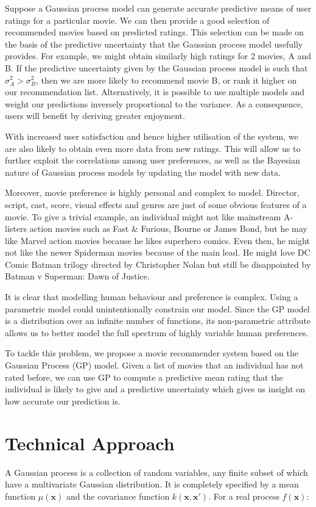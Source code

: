 \documentclass[letterpaper]{article}
\begin{document}
Suppose a Gaussian process model can generate accurate predictive means of user ratings for a particular movie. We can then provide a good selection of recommended movies based on predicted ratings. This selection can be made on the basis of the predictive uncertainty that the Gaussian process model usefully provides. For example, we might obtain similarly high ratings for 2 movies, A and B. If the predictive uncertainty given by the Gaussian process model is such that $\sigma_A^2 > \sigma_B^2$, then we are more likely to recommend movie B, or rank it higher on our recommendation list. Alternatively, it is possible to use multiple models and weight our predictions inversely proportional to the variance. As a consequence, users will benefit by deriving greater enjoyment.

With increased user satisfaction and hence higher utilisation of the system, we are also likely to obtain even more data from new ratings. This will allow us to further exploit the correlations among user preferences, as well as the Bayesian nature of Gaussian process models by updating the model with new data.

Moreover, movie preference is highly personal and complex to model. Director, script, cast, score, visual effects and genres are just of some obvious features of a movie. To give a trivial example, an individual might not like mainstream A-listers action movies such as Fast \& Furious, Bourne or James Bond, but he may like Marvel action movies because he likes superhero comics. Even then, he might not like the newer Spiderman movies because of the main lead. He might love DC Comic Batman trilogy directed by Christopher Nolan but still be disappointed by Batman v Superman: Dawn of Justice.

It is clear that modelling human behaviour and preference is complex. Using a parametric model could unintentionally constrain our model. Since the GP model is a distribution over an infinite number of functions, its non-parametric attribute allows us to better model the full spectrum of highly variable human preferences.

To tackle this problem, we propose a movie recommender system based on the Gaussian Process (GP) model. Given a list of movies that an individual has not rated before, we can use GP to compute a predictive mean rating that the individual is likely to give and a predictive uncertainty which gives us insight on how accurate our prediction is.

\section{Technical Approach}
A Gaussian process is a collection of random variables, any finite subset of which have a multivariate Gaussian distribution. It is completely specified by a mean function $\mu(\textbf{x})$ and the covariance function $k(\textbf{x}, \textbf{x}')$. For a real process $f(\textbf{x})$:
\end{document}

